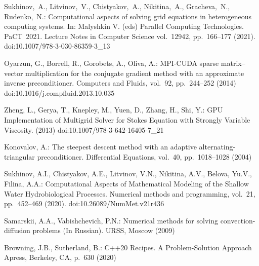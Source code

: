 \documentclass{svproc}
\providecommand{\doi}[1]{doi:\discretionary{}{}{}#1}
\begin{document}
\begin{thebibliography}{6}
Sukhinov,~A., Litvinov,~V., Chistyakov,~A., Nikitina,~A., Gracheva,~N., Rudenko,~N.:
Computational aspects of solving grid equations in heterogeneous computing systems.
In: Malyshkin V. (eds) Parallel Computing Technologies. PaCT~2021. Lecture Notes in Computer Science
vol.~12942,
pp.~166--177
(2021).
\doi{10.1007/978-3-030-86359-3\_13}

Oyarzun, G., Borrell, R., Gorobets, A., Oliva, A.:
MPI-CUDA sparse matrix–vector multiplication for the conjugate gradient method with an approximate inverse preconditioner.
Computers and Fluids,
vol.~92,
pp.~244--252
(2014)
\doi{10.1016/j.compfluid.2013.10.035}

Zheng, L., Gerya, T., Knepley, M., Yuen, D., Zhang, H., Shi, Y.:
GPU Implementation of Multigrid Solver for Stokes Equation with Strongly Variable Viscosity.
(2013)
\doi{10.1007/978-3-642-16405-7\_21}

Konovalov, A.:
The steepest descent method with an adaptive alternating-triangular preconditioner.
Differential Equations,
vol.~40,
pp.~1018--1028
(2004)

Sukhinov, A.I., Chistyakov, A.E., Litvinov, V.N., Nikitina, A.V., Belova, Yu.V., Filina, A.A.: Computational Aspects of Mathematical Modeling of the Shallow Water Hydrobiological Processes.
Numerical methods and programming,
vol.~21,
pp.~452--469
(2020).
\doi{10.26089/NumMet.v21r436}

Samarskii, A.A., Vabishchevich, P.N.:
Numerical methods for solving convection-diffusion problems (In Russian).
URSS,
Moscow
(2009)

Browning, J.B., Sutherland, B.:
C++20 Recipes. A Problem-Solution Approach
Apress, Berkeley, CA,
p.~630
(2020)

\end{thebibliography}
\end{document}
